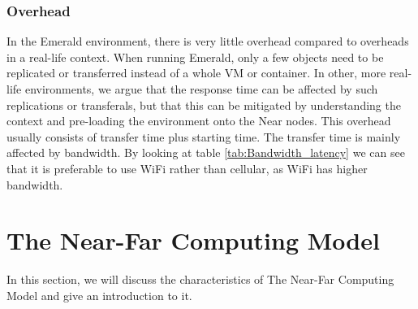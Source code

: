 \subsubsection{Overhead}
In the Emerald environment, there is very little overhead compared to overheads in a real-life context. When running Emerald, only a few objects need to be replicated or transferred instead of a whole VM or container. In other, more real-life environments, we argue that the response time can be affected by such replications or transferals, but that this can be mitigated by understanding the context and pre-loading the environment onto the Near nodes. This overhead usually consists of transfer time plus starting time. The transfer time is mainly affected by bandwidth. By looking at table \ref{tab:Bandwidth_latency} we can see that it is preferable to use WiFi rather than cellular, as WiFi has higher bandwidth.








\section{The Near-Far Computing Model}
In this section, we will discuss the characteristics of The Near-Far Computing Model and give an introduction to it. 





